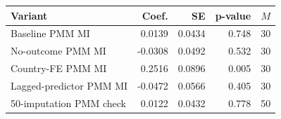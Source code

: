 \begin{tabular}{@{}lrrrr@{}}
\toprule
Variant & Coef. & SE & p-value & \(M\) \\
\midrule
Baseline PMM MI & 0.0139 & 0.0434 & 0.748 & 30 \\
No-outcome PMM MI & -0.0308 & 0.0492 & 0.532 & 30 \\
Country-FE PMM MI & 0.2516 & 0.0896 & 0.005 & 30 \\
Lagged-predictor PMM MI & -0.0472 & 0.0566 & 0.405 & 30 \\
50-imputation PMM check & 0.0122 & 0.0432 & 0.778 & 50 \\
\bottomrule
\end{tabular}
